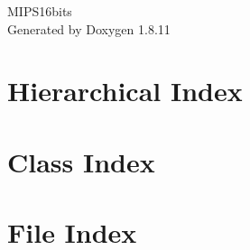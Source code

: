 \documentclass[twoside]{book}
\newcommand{\+}{\discretionary{\mbox{\scriptsize$\hookleftarrow$}}{}{}}
\newcommand{\clearemptydoublepage}{%
  \newpage{\pagestyle{empty}\cleardoublepage}%
}
\begin{document}
\hypersetup{pageanchor=false,
             bookmarksnumbered=true,
             pdfencoding=unicode
            }
\begin{titlepage}
\vspace*{7cm}
\begin{center}%
{\Large M\+I\+P\+S16bits }\\
\vspace*{1cm}
{\large Generated by Doxygen 1.8.11}\\
\end{center}
\end{titlepage}
\clearemptydoublepage
\tableofcontents
\clearemptydoublepage
{}
\hypersetup{pageanchor=true}

\chapter{Hierarchical Index}

\chapter{Class Index}

\chapter{File Index}

\end{document}
